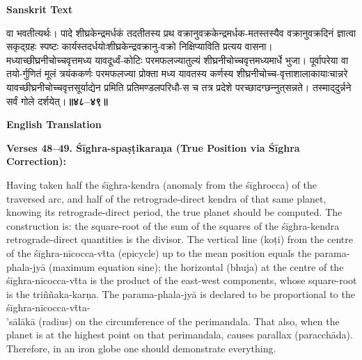 \documentclass[11pt,a4paper]{article}
\newcommand{\vs}[1]{\textcolor{vernumcolor}{\textbf{#1}}}
\begin{document}
\begin{minipage}[t]{0.48\textwidth}
\textbf{\small Sanskrit Text}

\small\devanagarifont
वा भवतीत्यर्थः। पादे शीघ्रकेन्‍द्रमर्धकं तदतीतस्य प्रथ वक्रानुवक्रकेन्‍द्रमर्धक-मतस्तस्यैव वक्रानुवक्रदिनं ज्ञात्वा सकृद्‌ग्रहः स्पष्टः कार्यस्तदर्धयोःशीघ्रकेन्‍द्रवक्रानु-वक्रो निक्षिप्याविति प्रत्यय वासना। मध्याच्छीघ्रनीचोच्चवृत्तमध्य यावदूर्ध्वं-कोटिः परमफलज्यातुल्यं शीघ्रनीचोच्चवृत्तमध्यमार्धे भुजा। पूर्वापरेया वा तयो-र्गुणितं मूलं त्रयंककर्णः परमफलज्या प्रोक्ता मध्य यावतस्य कर्णस्य शीघ्रनीचोच्च-वृत्ताशालाकायाःचान्नरे यावच्छीघ्रनीचोच्चवृत्तसूर्याद्येन प्रमिति प्रतिमण्डलपरिधौ-स च तत्र प्रदेशे परच्छादग्छन्‍नुत्‌सन्नते। तस्माद्‌दुर्न्नने सर्वं गोले दर्शयेत्।\hfill\vs{॥४८--४९॥}
\end{minipage}%
\hfill
\begin{minipage}[t]{0.48\textwidth}
\textbf{\small English Translation}

\textbf{Verses 48--49. \'S\=ighra-spa\d{s}\d{t}ikara\d{n}a (True Position via \'S\=ighra Correction):}

Having taken half the \'s\=ighra-kendra (anomaly from the \'s\=ighrocca) of the traversed arc, and half of the retrograde-direct kendra of that same planet, knowing its retrograde-direct period, the true planet should be computed. The construction is: the square-root of the sum of the squares of the \'s\=ighra-kendra retrograde-direct quantities is the divisor. The vertical line (ko\d{t}i) from the centre of the \'s\=ighra-n\=icocca-v\=tta (epicycle) up to the mean position equals the parama-phala-jy\=a (maximum equation sine); the horizontal (bhuja) at the centre of the \'s\=ighra-n\=icocca-v\=tta is the product of the east-west components, whose square-root is the tri\~n\~naka-kar\d{n}a. The parama-phala-jy\=a is declared to be proportional to the \'s\=ighra-n\=icocca-v\=tta-\\'s\=al\=ak\=a (radius) on the circumference of the perimandala. That also, when the planet is at the highest point on that perimandala, causes parallax (paracch\=ada). Therefore, in an iron globe one should demonstrate everything.
\end{minipage}
\end{document}
